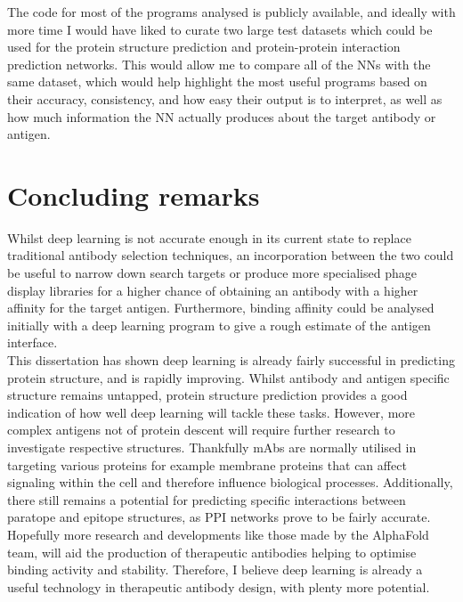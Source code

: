 The code for most of the programs analysed is publicly available, and ideally with more time I would have liked to curate two large test datasets which could be used for the protein structure prediction and protein-protein interaction prediction networks. This would allow me to compare all of the NNs with the same dataset, which would help highlight the most useful programs based on their accuracy, consistency, and how easy their output is to interpret, as well as how much information the NN actually produces about the target antibody or antigen.

\section{Concluding remarks}

Whilst deep learning is not accurate enough in its current state to replace traditional antibody selection techniques, an incorporation between the two could be useful to narrow down search targets or produce more specialised phage display libraries for a higher chance of obtaining an antibody with a higher affinity for the target antigen. Furthermore, binding affinity could be analysed initially with a deep learning program to give a rough estimate of the antigen interface. 
\\[12pt]
This dissertation has shown deep learning is already fairly successful in predicting protein structure, and is rapidly improving. Whilst antibody and antigen specific structure remains untapped, protein structure prediction provides a good indication of how well deep learning will tackle these tasks. However, more complex antigens not of protein descent will require further research to investigate respective structures. Thankfully mAbs are normally utilised in targeting various proteins for example membrane proteins that can affect signaling within the cell and therefore influence biological processes. Additionally, there still remains a potential for predicting specific interactions between paratope and epitope structures, as PPI networks prove to be fairly accurate. Hopefully more research and developments like those made by the AlphaFold team, will aid the production of therapeutic antibodies helping to optimise binding activity and stability. Therefore, I believe deep learning is already a useful technology in therapeutic antibody design, with plenty more potential.
